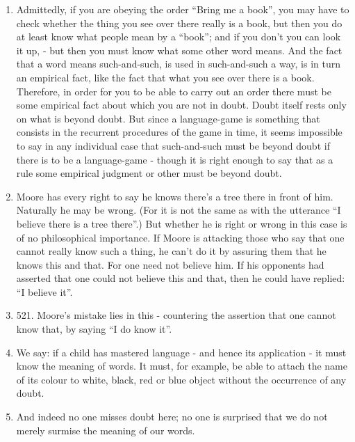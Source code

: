 \documentclass{book}
\begin{document}
\begin{enumerate}
\item
Admittedly, if you are obeying the order ``Bring me a book'', you may have to
check whether the thing you see over there really is a book, but then you do at
least know what people mean by a ``book''; and if you don't you can look it up,
- but then you must know what some other word means. And the fact that a word
means such-and-such, is used in such-and-such a way, is in turn an empirical
fact, like the fact that what you see over there is a book.  Therefore, in
order for you to be able to carry out an order there must be some empirical
fact about which you are not in doubt. Doubt itself rests only on what is
beyond doubt.  But since a language-game is something that consists in the
recurrent procedures of the game in time, it seems impossible to say in any
individual case that such-and-such must be beyond doubt if there is to be a
language-game - though it is right enough to say that as a rule some empirical
judgment or other must be beyond doubt.

\item
Moore has every right to say he knows there's a tree there in front of him.
Naturally he may be wrong. (For it is not the same as with the utterance ``I
believe there is a tree there''.) But whether he is right or wrong in this case
is of no philosophical importance. If Moore is attacking those who say that one
cannot really know such a thing, he can't do it by assuring them that he knows
this and that. For one need not believe him. If his opponents had asserted that
one could not believe this and that, then he could have replied: ``I believe
it''.

\item

521.
Moore's mistake lies in this - countering the assertion that one cannot know
that, by saying ``I do know it''.

\item
We say: if a child has mastered language - and hence its application - it must
know the meaning of words. It must, for example, be able to attach the name of
its colour to white, black, red or blue object without the occurrence of any
doubt.

\item
And indeed no one misses doubt here; no one is surprised that we do not merely
surmise the meaning of our words.


\end{enumerate}
\end{document}
